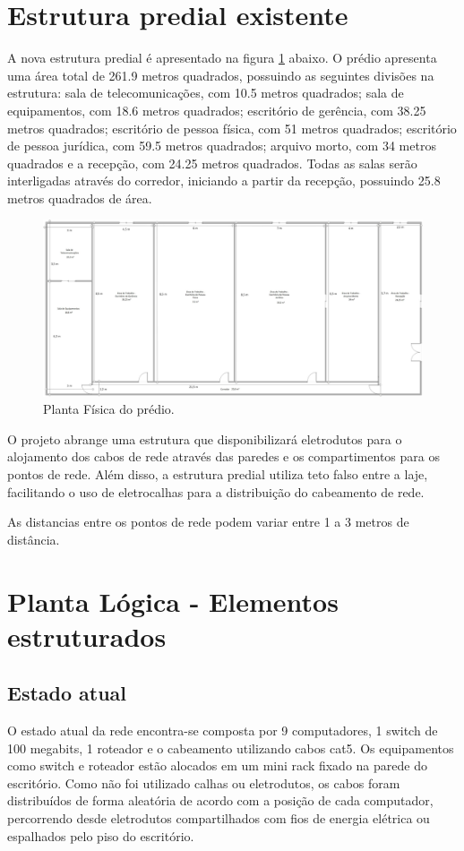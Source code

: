 \documentclass[	DIV=calc,%
							paper=a4,%
							fontsize=12pt,%
							onecolumn]{scrartcl}	 					%
\begin{document}
\section{Estrutura predial existente}
A nova estrutura predial é apresentado na figura \ref{fisica1} abaixo. O prédio apresenta uma área total de 261.9 metros quadrados, possuindo as seguintes divisões na estrutura: sala de telecomunicações, com 10.5 metros quadrados; sala de equipamentos, com 18.6 metros quadrados; escritório de gerência, com 38.25 metros quadrados; escritório de pessoa física, com 51 metros quadrados; escritório de pessoa jurídica, com 59.5 metros quadrados; arquivo morto, com 34 metros quadrados e a recepção, com 24.25 metros quadrados. Todas as salas serão interligadas através do corredor, iniciando a partir da recepção, possuindo 25.8 metros quadrados de área.

\begin{figure}[h]
	\centering
	\includegraphics[scale=0.23]{fisica1}
	\caption{Planta Física do prédio.}
	\label{fisica1}
\end{figure} 

O projeto abrange uma estrutura que disponibilizará eletrodutos para o alojamento dos cabos de rede através das paredes e os compartimentos para os pontos de rede. Além disso, a estrutura predial utiliza teto falso entre a laje, facilitando o uso de eletrocalhas para a distribuição do cabeamento de rede.

As distancias entre os pontos de rede podem variar entre 1 a 3 metros de distância.

\section{Planta Lógica - Elementos estruturados}

\subsection{Estado atual}
O estado atual da rede encontra-se composta por 9 computadores, 1 switch de 100 megabits, 1 roteador e o cabeamento utilizando cabos cat5. Os equipamentos como switch e roteador estão alocados em um mini rack fixado na parede do escritório. Como não foi utilizado calhas ou eletrodutos, os cabos foram distribuídos de forma aleatória de acordo com a posição de cada computador, percorrendo desde eletrodutos compartilhados com fios de energia elétrica ou espalhados pelo piso do escritório.
\end{document}
